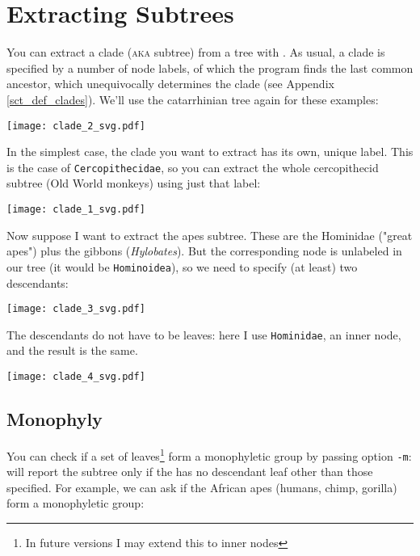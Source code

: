 

\section{Extracting Subtrees}
\label{sct_subtrees}

You can extract a clade (\textsc{aka} subtree) from a tree with \clade. As
usual, a clade is specified by a number of node labels, of which the program
finds the last common ancestor, which unequivocally determines the clade (see
Appendix \ref{sct_def_clades}).  We'll use the catarrhinian tree again for
these examples:


\begin{center}
\texttt{[image: clade\_2\_svg.pdf]}
\end{center}

In the simplest case, the clade you want to extract has its own, unique label.
This is the case of \texttt{Cercopithecidae}, so you can extract the whole
cercopithecid subtree (Old World monkeys) using just that label:


\begin{center}
  \texttt{[image: clade\_1\_svg.pdf]}
\end{center}

Now suppose I want to extract the apes subtree. These are the Hominidae
("great apes") plus the gibbons (\textit{Hylobates}). But the corresponding
node is unlabeled in our tree (it would be \texttt{Hominoidea}), so we need to specify (at least) two descendants:


\begin{center}
  \texttt{[image: clade\_3\_svg.pdf]}
\end{center}

\noindent{}The descendants do not have to be leaves: here I use \texttt{Hominidae}, an inner node, and the result is the same.


\begin{center}
  \texttt{[image: clade\_4\_svg.pdf]}
\end{center}

\subsection{Monophyly}

You can check if a set of leaves\footnote{In future versions I may extend this
to inner nodes} form a monophyletic group by passing option \texttt{-m}:
\clade{} will report the subtree only if the \lca{} has no descendant leaf
other than those specified.  For example, we can ask if the African apes
(humans, chimp, gorilla) form a monophyletic group:

